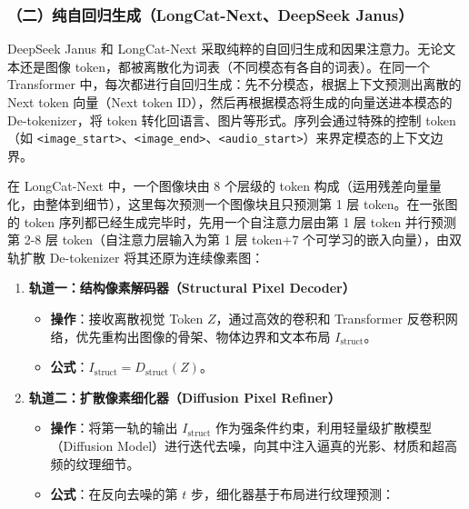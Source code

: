 \hypertarget{ux4e8cux7eafux81eaux56deux5f52ux751fux6210longcat-nextdeepseek-janus}{%
\subsubsection{（二）纯自回归生成（LongCat-Next、DeepSeek Janus）}\label{ux4e8cux7eafux81eaux56deux5f52ux751fux6210longcat-nextdeepseek-janus}}

DeepSeek Janus 和 LongCat-Next 采取纯粹的自回归生成和因果注意力。无论文本还是图像 token，都被离散化为词表（不同模态有各自的词表）。在同一个 Transformer 中，每次都进行自回归生成：先不分模态，根据上下文预测出离散的 Next token 向量（Next token ID），然后再根据模态将生成的向量送进本模态的 De-tokenizer，将 token 转化回语言、图片等形式。序列会通过特殊的控制 token（如 \texttt{\textless{}image\_start\textgreater{}}、\texttt{\textless{}image\_end\textgreater{}}、\texttt{\textless{}audio\_start\textgreater{}}）来界定模态的上下文边界。

在 LongCat-Next 中，一个图像块由 8 个层级的 token 构成（运用残差向量量化，由整体到细节），这里每次预测一个图像块且只预测第 1 层 token。在一张图的 token 序列都已经生成完毕时，先用一个自注意力层由第 1 层 token 并行预测第 2-8 层 token（自注意力层输入为第 1 层 token+7 个可学习的嵌入向量），由双轨扩散 De-tokenizer 将其还原为连续像素图：

\begin{enumerate}
\def\labelenumi{\arabic{enumi}.}
\item
  \textbf{轨道一：结构像素解码器（Structural Pixel Decoder）}

  \begin{itemize}
  \tightlist
  \item
    \textbf{操作}：接收离散视觉 Token \(Z\)，通过高效的卷积和 Transformer 反卷积网络，优先重构出图像的骨架、物体边界和文本布局 \(I_{\mathrm{struct}}\)。
  \item
    \textbf{公式}：\(I_{\mathrm{struct}}=D_{\mathrm{struct}}(Z)\)。
  \end{itemize}
\item
  \textbf{轨道二：扩散像素细化器（Diffusion Pixel Refiner）}

  \begin{itemize}
  \tightlist
  \item
    \textbf{操作}：将第一轨的输出 \(I_{\mathrm{struct}}\) 作为强条件约束，利用轻量级扩散模型（Diffusion Model）进行迭代去噪，向其中注入逼真的光影、材质和超高频的纹理细节。
  \item
{}
    \textbf{公式}：在反向去噪的第 \(t\) 步，细化器基于布局进行纹理预测：
  \end{itemize}
\end{enumerate}

